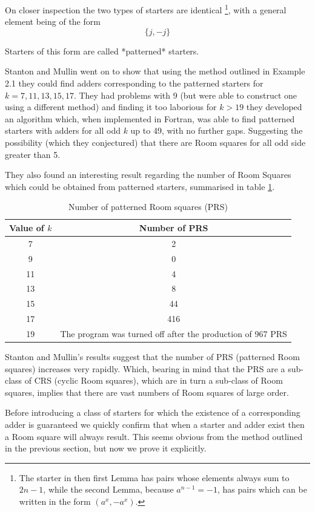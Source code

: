 \documentclass[11pt, a4paper]{book}\usepackage[]{graphicx}\usepackage[]{xcolor}
\begin{document}
On closer inspection the two types of starters are
identical
\footnote{The starter in then first Lemma has pairs whose elements always
    sum to $2n-1$, while the second Lemma, because $a^{n-1}=-1$, has
    pairs which can be written in the form $(a^x,-a^x)$.},
with a general element being of the form
$$\{j,-j\}$$

Starters of this form are called *patterned* starters.

Stanton and Mullin went on to show that using the method
outlined in Example 2.1 they could find adders corresponding
to the patterned starters for $k = 7, 11, 13, 15, 17$. They had
problems with 9 (but were able to construct one using a
different method) and finding it too laborious for $k > 19$
they developed an algorithm which, when implemented in
Fortran, was able to find patterned starters with adders for
all odd $k$ up to 49, with no further gaps. Suggesting the
possibility (which they conjectured) that there are Room
squares for all odd side greater than 5.

They also found an interesting result regarding the number
of Room Squares which could be obtained from patterned
starters, summarised in table \ref{tab:patterned}. 

\begin{table}[h!]
  \begin{center}
    \caption{Number of patterned Room squares (PRS)}
    \label{tab:patterned}
    \begin{tabular}{c|c}
    Value of $k$ & Number of PRS \\ \hline
    7 & 2 \\
    9 & 0 \\
    11 & 4 \\
    13 & 8 \\
    15 & 44 \\
    17 & 416 \\
    19 & The program was turned off after the production of 967 PRS
    \end{tabular}
  \end{center}
\end{table}

Stanton and Mullin’s results suggest that the number of PRS
(patterned Room squares) increases very rapidly. Which,
bearing in mind that the PRS are a sub-class of CRS (cyclic
Room squares), which are in turn a sub-class of Room
squares, implies that there are vast numbers of Room squares
of large order.

Before introducing a class of starters for which the
existence of a corresponding adder is guaranteed we quickly
confirm that when a starter and adder exist then a Room
square will always result. This seems obvious from the
method outlined in the previous section, but now we prove it
explicitly.
\end{document}
